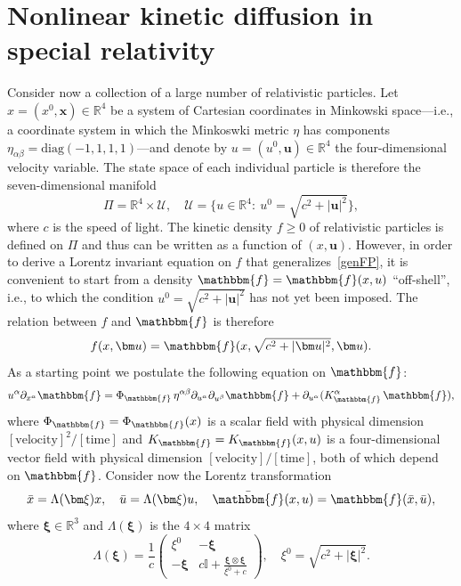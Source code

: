 \documentclass[12pt]{article}
\newcommand{\R}{\mathbb{R}}
\theoremstyle{definition}
\numberwithin{equation}{section}
\begin{document}
\section{Nonlinear kinetic diffusion in special relativity}\label{relativistic}
Consider now a collection of a large number of relativistic particles. Let $x=(x^0,{\bm x})\in\R^4$ be a system of Cartesian coordinates in Minkowski space---i.e., a coordinate system in which the Minkoswki metric $\eta$ has components $\eta_{\alpha\beta}=\mathrm{diag}(-1,1,1,1)$---and denote by $u=(u^0,{\bm u})\in\R^4$ the four-dimensional velocity variable. The state space of each individual particle is therefore the seven-dimensional manifold 
\[
\Pi=\R^4\times\mathcal{U}, \quad \mathcal{U}=\{u\in\R^4: \ u^0=\sqrt{c^2+|{\bm u}|^2}\},
\]
where $c$ is the speed of light. 
The kinetic density $f\geq0$ of relativistic particles is defined on $\Pi$ and thus can be written as a function of $(x,{\bm u})$. However, in order to derive a Lorentz invariant equation on $f$ that generalizes~\eqref{genFP}, it is convenient to start from a density $\mathbbm{f}=\mathbbm{f}(x,u)$ ``off-shell'', i.e., to which the condition $u^0=\sqrt{c^2+|{\bm u}|^2}$ has not yet been imposed. The relation between $f$ and $\mathbbm{f}$ is therefore
\[
f(x, {\bm u})=\mathbbm{f}(x, \sqrt{c^2+|{\bm u}|^2}, {\bm u}).
\]
As a starting point we postulate the following equation on $\mathbbm{f}$:
\begin{equation}\label{eqf*}
u^\alpha\partial_{x^\alpha}\mathbbm{f}=\Phi_\mathbbm{f} \, \eta^{\alpha\beta}\partial_{u^\alpha}\partial_{u^\beta} \mathbbm{f}+\partial_{u^\alpha} (K_\mathbbm{f}^\alpha \, \mathbbm{f}),
\end{equation}
where $\Phi_\mathbbm{f} =\Phi_\mathbbm{f} (x)$ is a scalar field with physical dimension $[\mathrm{velocity}]^2/[\mathrm{time}]$ and $K_\mathbbm{f} =K_\mathbbm{f} (x,u)$ is a four-dimensional vector field with physical dimension $[\mathrm{velocity}]/[\mathrm{time}]$, both of which depend on $\mathbbm{f}$. Consider now the Lorentz transformation
\begin{equation}\label{inv4d}
\bar{x}=\Lambda({\bm\xi}) x, \quad \bar{u}=\Lambda({\bm\xi}) u,\quad \bar{\mathbbm{f}}(x,u)= \mathbbm{f}(\bar{x},\bar{u}),
\end{equation}
where ${\bm \xi}\in\R^3$ and $\Lambda({\bm\xi})$ is the $4\times 4$ matrix
\[
\Lambda({\bm\xi}) =\frac{1}{c}\left(\begin{array}{cc} \displaystyle{\xi^0} & \displaystyle{-{\bm \xi}} \\ \displaystyle{-{\bm \xi}} & \displaystyle{c\mathbb{I}+\frac{{\bm \xi}\otimes{\bm \xi}}{\xi^0+c}}\end{array}\right),\quad \xi^0=\sqrt{c^2+|{\bm \xi}|^2}.
\]
\end{document}
